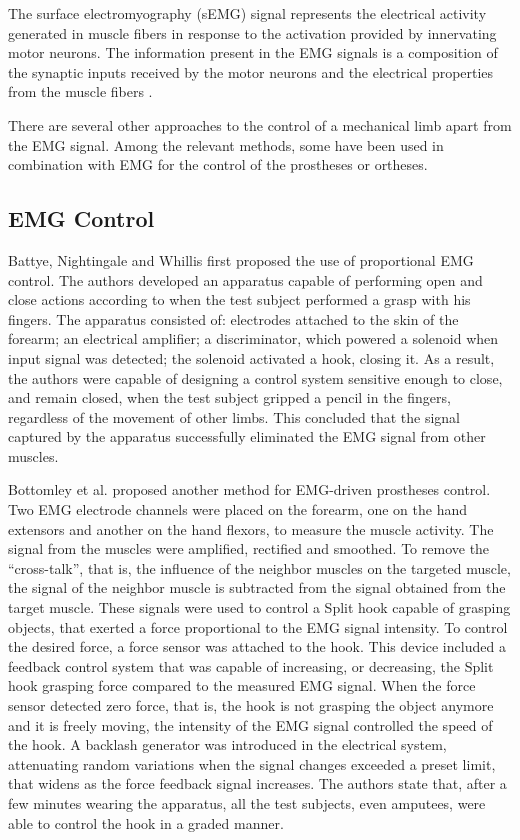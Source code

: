     The surface electromyography (sEMG) signal represents the electrical activity generated in muscle fibers in response to the activation provided by innervating motor neurons. The information present in the EMG signals is a composition of the synaptic inputs received by the motor neurons and the electrical properties from the muscle fibers \cite{Farina1215}.
    
     There are several other approaches to the control of a mechanical limb apart from the EMG signal. Among the relevant methods, some have been used in combination with EMG for the control of the prostheses or ortheses.
    

\subsection{EMG Control}

    Battye, Nightingale and Whillis \cite{Battye506} first proposed the use of proportional EMG control. The authors developed an apparatus capable of performing open and close actions according to when the test subject performed a grasp with his fingers. The apparatus consisted of: electrodes attached to the skin of the forearm; an electrical amplifier; a discriminator, which powered a solenoid when input signal was detected; the solenoid activated a hook, closing it. As a result, the authors were capable of designing a control system sensitive enough to close, and remain closed, when the test subject gripped a pencil in the fingers, regardless of the movement of other limbs. This concluded that the signal captured by the apparatus successfully eliminated the EMG signal from other muscles.
	
    Bottomley et al. \cite{Bottomley411} proposed another method for EMG-driven prostheses control. Two EMG electrode channels were placed on the forearm, one on the hand extensors and another on the hand flexors, to measure the muscle activity.  The signal from the muscles were amplified, rectified and smoothed. To remove the “cross-talk”, that is, the influence of the neighbor muscles on the targeted muscle, the signal of the neighbor muscle is subtracted from the signal obtained from the target muscle. These signals were used to control a Split hook capable of grasping objects, that exerted a force proportional to the EMG signal intensity. To control the desired force, a force sensor was attached to the hook. This device included a feedback control system that was capable of increasing, or decreasing, the Split hook grasping force compared to the measured EMG signal. When the force sensor detected zero force, that is, the hook is not grasping the object anymore and it is freely moving, the intensity of the EMG signal controlled the speed of the hook. A backlash generator was introduced in the electrical system, attenuating random variations when the signal changes exceeded a preset limit, that widens as the force feedback signal increases. The authors state that, after a few minutes wearing the apparatus, all the test subjects, even amputees, were able to control the hook in a graded manner.
    
